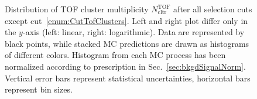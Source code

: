 \begin{figure}[ht!]
{  \begin{subfigure}[b]{\linewidth}{
                }
  \end{subfigure}
}%
\caption[Distribution of TOF cluster multiplicity $N^{\text{TOF}}_{\text{cltr}}$.]{Distribution of TOF cluster multiplicity $N^{\text{TOF}}_{\text{cltr}}$ after all selection cuts except cut~\ref{enum:CutTofClusters}. Left and right plot differ only in the $y$-axis (left: linear, right: logarithmic). Data are represented by black points, while stacked MC predictions are drawn as histograms of different colors. Histogram from each MC process has been normalized according to prescription in Sec.~\ref{sec:bkgdSignalNorm}. Vertical error bars represent statistical uncertainties, horizontal bars represent bin sizes.}\label{fig:NTofClusters}
\end{figure}%

